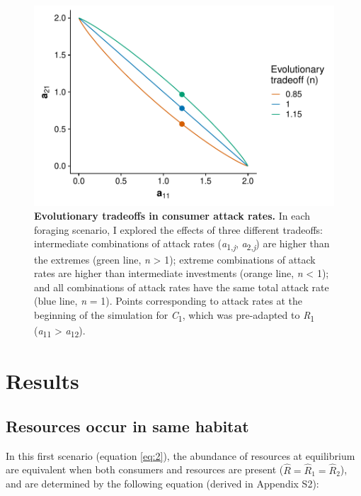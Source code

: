 \documentclass[11pt,]{article}
\begin{document}
\begin{figure}
\centering
\includegraphics{Fig_2_Tradeoffs.pdf}
\caption{\label{fig:tradeoff}\textbf{Evolutionary tradeoffs in consumer
attack rates.} In each foraging scenario, I explored the effects of
three different tradeoffs: intermediate combinations of attack rates
(\emph{a}\textsubscript{1,\emph{j}}, \emph{a}\textsubscript{2,\emph{j}})
are higher than the extremes (green line, \emph{n} \textgreater{} 1);
extreme combinations of attack rates are higher than intermediate
investments (orange line, \emph{n} \textless{} 1); and all combinations
of attack rates have the same total attack rate (blue line, \emph{n} =
1). Points corresponding to attack rates at the beginning of the
simulation for \emph{C}\textsubscript{1}, which was pre-adapted to
\emph{R}\textsubscript{1} (\emph{a}\textsubscript{11} \textgreater{}
\emph{a}\textsubscript{12}).}
\end{figure}

\section{Results}\label{results}

\subsection{Resources occur in same
habitat}\label{resources-occur-in-same-habitat}

In this first scenario (equation \ref{eq:2}), the abundance of resources
at equilibrium are equivalent when both consumers and resources are
present (\(\hat R = \hat R_1 = \hat R_2\)), and are determined by the
following equation (derived in Appendix S2):
\end{document}

